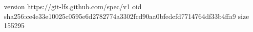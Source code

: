version https://git-lfs.github.com/spec/v1
oid sha256:ce4e33e10025c0595e6d2782774a3302fcd90aa0bfedcfd7714764df33b4ffa9
size 155295
